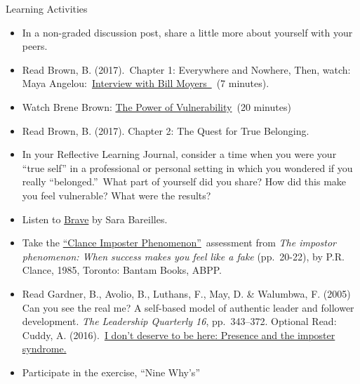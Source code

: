 \documentclass[
]{book}
\providecommand{\tightlist}{%
  \setlength{\itemsep}{0pt}\setlength{\parskip}{0pt}}
\begin{document}
\begin{reflect}
{Learning Activities}

\begin{itemize}
\tightlist
\item
  In a non-graded discussion post, share a little more about yourself
  with your peers.\\
\item
  Read Brown, B. (2017).~Chapter 1: Everywhere and Nowhere, Then, watch:
  Maya
  Angelou:~\href{http://billmoyers.com/content/conversation-maya-angelou/}{Interview
  with Bill Moyers~}~(7 minutes).\\
\item
  Watch Brene Brown:
  \href{https://www.ted.com/talks/brene_brown_on_vulnerability}{The
  Power of Vulnerability}~(20 minutes)\\
\item
  Read Brown, B. (2017). Chapter 2: The Quest for True Belonging.\\
\item
  In your Reflective Learning Journal, consider a time when you were
  your ``true self'' in a professional or personal setting in which you
  wondered if you really ``belonged.''~What part of yourself did you
  share? How did this make you feel vulnerable? What were the results?\\
\item
  Listen to \href{https://www.youtube.com/watch?v=QUQsqBqxoR4}{Brave} by
  Sara Bareilles.\\
\item
  Take the
  \href{https://paulineroseclance.com/pdf/IPscoringtest.pdf}{``Clance
  Imposter Phenomenon''}~assessment from \emph{The impostor phenomenon:
  When success makes you feel like a fake} (pp.~20-22), by P.R. Clance,
  1985, Toronto: Bantam Books, ABPP.\\
\item
  Read Gardner, B., Avolio, B., Luthans, F., May, D. \& Walumbwa, F.
  (2005) Can you see the real me? A self-based model of authentic leader
  and follower development. \emph{The Leadership Quarterly 16},
  pp.~343--372. Optional Read: Cuddy, A.
  (2016).~\href{https://leanin.org/news-inspiration/overcoming-imposter-syndrome-to-reveal-your-presence}{I
  don't deserve to be here: Presence and the imposter syndrome.}\\
\item
  Participate in the exercise, ``Nine Why's''
\end{itemize}
\end{reflect}
\end{document}

